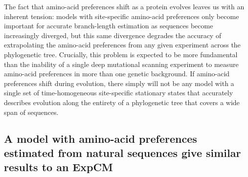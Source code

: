 \documentclass[11pt]{article}
\begin{document}
The fact that amino-acid preferences shift as a protein evolves leaves us with an inherent tension: models with site-specific amino-acid preferences only become important for accurate branch-length estimation as sequences become increasingly diverged, but this same divergence degrades the accuracy of extrapolating the amino-acid preferences from any given experiment across the phylogenetic tree.
Crucially, this problem is expected to be more fundamental than the inability of a single deep mutational scanning experiment to measure amino-acid preferences in more than one genetic background.
If amino-acid preferences shift during evolution, there simply will not be any model with a single set of time-homogeneous site-specific stationary states that accurately describes evolution along the entirety of a phylogenetic tree that covers a wide span of sequences.

\subsection*{A model with amino-acid preferences estimated from natural sequences give similar results to an ExpCM}
\end{document}
